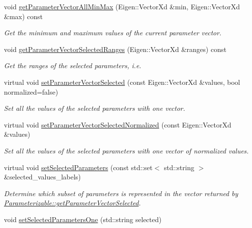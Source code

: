 \begin{DoxyCompactItemize}
void \hyperlink{classDmpBbo_1_1Parameterizable_a98f0b11a115da5b5bb7c0fcc6394dc71}{get\+Parameter\+Vector\+All\+Min\+Max} (Eigen\+::\+Vector\+Xd \&min, Eigen\+::\+Vector\+Xd \&max) const 
\begin{DoxyCompactList}\small\item\em Get the minimum and maximum values of the current parameter vector. \end{DoxyCompactList}\item 
void \hyperlink{classDmpBbo_1_1Parameterizable_a0d6c46b1c9d1a9c467bd458cd0c9c91d}{get\+Parameter\+Vector\+Selected\+Ranges} (Eigen\+::\+Vector\+Xd \&ranges) const 
\begin{DoxyCompactList}\small\item\em Get the ranges of the selected parameters, i.\+e. \end{DoxyCompactList}\item 
virtual void \hyperlink{classDmpBbo_1_1Parameterizable_aee501e63a46d63eb58a6f271bf093b9d}{set\+Parameter\+Vector\+Selected} (const Eigen\+::\+Vector\+Xd \&values, bool normalized=false)
\begin{DoxyCompactList}\small\item\em Set all the values of the selected parameters with one vector. \end{DoxyCompactList}\item 
virtual void \hyperlink{classDmpBbo_1_1Parameterizable_a308782474c315c3e40a00daf4cb3cc37}{set\+Parameter\+Vector\+Selected\+Normalized} (const Eigen\+::\+Vector\+Xd \&values)
\begin{DoxyCompactList}\small\item\em Set all the values of the selected parameters with one vector of normalized values. \end{DoxyCompactList}\item 
virtual void \hyperlink{classDmpBbo_1_1Parameterizable_a8a976b5db2d1809ece10e431816f0f27}{set\+Selected\+Parameters} (const std\+::set$<$ std\+::string $>$ \&selected\+\_\+values\+\_\+labels)
\begin{DoxyCompactList}\small\item\em Determine which subset of parameters is represented in the vector returned by \hyperlink{classDmpBbo_1_1Parameterizable_aab955bec57f074a991b8be31d6ce54ca}{Parameterizable\+::get\+Parameter\+Vector\+Selected}. \end{DoxyCompactList}\item 
void \hyperlink{classDmpBbo_1_1Parameterizable_a509c1ff41b1531ff93cf4a9da4278d40}{set\+Selected\+Parameters\+One} (std\+::string selected)

\end{DoxyCompactItemize}
